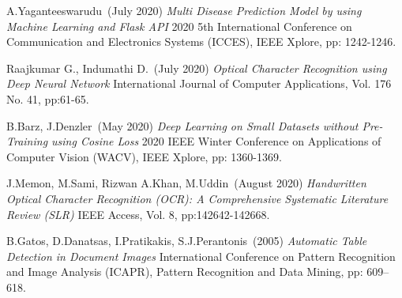 \begin{thebibliography}{999}
A.Yaganteeswarudu~(July 2020)
{\it Multi Disease Prediction Model by using Machine Learning and Flask API} 
2020 5th International Conference on Communication and Electronics Systems (ICCES), IEEE Xplore, pp: 1242-1246.

Raajkumar G., Indumathi D.~(July 2020)
{\it Optical Character Recognition using Deep Neural Network} 
International Journal of Computer Applications, Vol. 176 No. 41, pp:61-65.

B.Barz, J.Denzler~(May 2020)
{\it Deep Learning on Small Datasets without Pre-Training using Cosine Loss} 
2020 IEEE Winter Conference on Applications of Computer Vision (WACV), IEEE Xplore, pp: 1360-1369.

J.Memon, M.Sami, Rizwan A.Khan, M.Uddin~(August 2020)
{\it Handwritten Optical Character Recognition (OCR): A Comprehensive Systematic Literature Review (SLR)} 
IEEE Access, Vol. 8, pp:142642-142668.

B.Gatos, D.Danatsas, I.Pratikakis, S.J.Perantonis~(2005)
{\it Automatic Table Detection in Document Images}
International Conference on Pattern Recognition and Image Analysis (ICAPR), Pattern Recognition and Data Mining, pp: 609–618.

\end{thebibliography}




